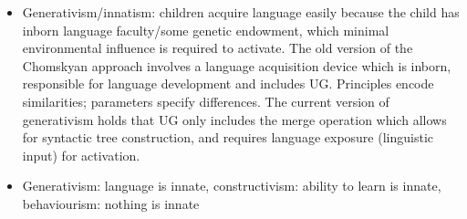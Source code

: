 \documentclass{article}
\begin{document}
\begin{itemize}
\begin{itemize}
        \item Generativism/innatism: children acquire language easily because the child has inborn language faculty/some genetic endowment, which minimal environmental influence is required to activate. The old version of the Chomskyan approach involves a language acquisition device which is inborn, responsible for language development and includes UG. Principles encode similarities; parameters specify differences. The current version of generativism holds that UG only includes the merge operation which allows for syntactic tree construction, and requires language exposure (linguistic input) for activation.
        \item Generativism: language is innate, constructivism: ability to learn is innate, behaviourism: nothing is innate
    \end{itemize}

\end{itemize}
\end{document}

